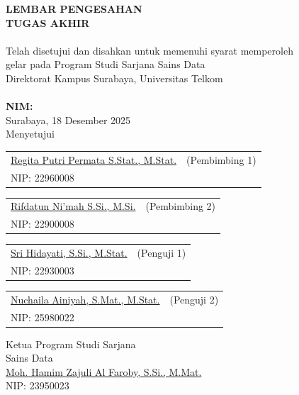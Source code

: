 \begin{center}

{\Large\bfseries LEMBAR PENGESAHAN}\\[0.3cm]
{\large\bfseries TUGAS AKHIR}\\[0.5cm]

\textbf{\large \Title}\\[0.5cm]

Telah disetujui dan disahkan untuk memenuhi syarat memperoleh\\
gelar pada Program Studi Sarjana Sains Data\\
Direktorat Kampus Surabaya, Universitas Telkom\\[0.3cm]

\textbf{\Author}\\
\textbf{NIM: \NIM}\\[0.3cm]

Surabaya, 18 Desember 2025 \\
Menyetujui\\ [1cm]

\begin{tabular}{p{9cm} p{5cm}}
\underline{Regita Putri Permata S.Stat., M.Stat.} & (Pembimbing 1)\\
NIP: 22960008 & \\
\end{tabular}

\vspace{1cm}

\begin{tabular}{p{9cm} p{5cm}}
\underline{Rifdatun Ni'mah S.Si., M.Si.} & (Pembimbing 2)\\
NIP: 22900008 & \\
\end{tabular}

\vspace{1cm}

\begin{tabular}{p{9cm} p{5cm}}
\underline{Sri Hidayati, S.Si., M.Stat.} & (Penguji 1)\\
NIP: 22930003 & \\
\end{tabular}

\vspace{1cm}

\begin{tabular}{p{9cm} p{5cm}}
\underline{Nuchaila Ainiyah, S.Mat., M.Stat.} & (Penguji 2)\\
NIP: 25980022 & \\
\end{tabular}

\vspace{1cm}
\end{center}
\begin{flushright}
Ketua Program Studi Sarjana\\
Sains Data\\[2cm]

\underline{Moh. Hamim Zajuli Al Faroby, S.Si., M.Mat.}\\
NIP: 23950023
\end{flushright}